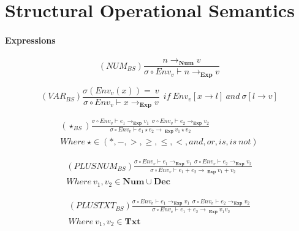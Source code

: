 \chapter{Structural Operational Semantics} \label{appendix:SOS}

\subsubsection{Expressions}

\begin{equation}
    (NUM_{BS})\frac{n \rightarrow _{\textbf{Num}} v}{\sigma \circ Env_v \vdash n \rightarrow _{\textbf{Exp}} v}
\end{equation}

\begin{equation}
    (VAR_{BS})\frac{\sigma(Env_v(x)) = \ v}{\sigma \circ Env_v \vdash x \rightarrow _{\textbf{Exp}} v } \ \
        if \ Env_v[x \rightarrow l] \ and \ \sigma[l \rightarrow v]
\end{equation}

\begin{equation}
\begin{split}
    (\star_{BS})\frac{\sigma \circ Env_v\vdash e_1 \rightarrow _{\textbf{Exp}} v_1 \ \ \sigma \circ Env_v \vdash e_2 \rightarrow _{\textbf{Exp}} v_2 }{\sigma \circ Env_v \vdash e_1 \star e_2 \rightarrow \ _{\textbf{Exp}} \ v_1 \star v_2 } \\
    Where \ \star \in (*, -, >, \geq, \leq, <, and, or, is, is \ not)
\end{split}
\end{equation}

\begin{equation}
    \begin{split}
        (PLUSNUM_{BS})\frac{\sigma \circ Env_v\vdash e_1 \rightarrow _{\textbf{Exp}} v_1 
        \ \ \sigma \circ Env_v \vdash e_2 \rightarrow _{\textbf{Exp}} v_2 }
        {\sigma \circ Env_v \vdash e_1 + e_2 \rightarrow \ _{\textbf{Exp}} \ v_1 + v_2 } \\
        Where \ v_1, v_2 \in \mathbf{Num \cup Dec}
    \end{split}
\end{equation}

\begin{equation}
    \begin{split}
        (PLUSTXT_{BS})\frac{\sigma \circ Env_v\vdash e_1 \rightarrow _{\textbf{Exp}} v_1 
        \ \ \sigma \circ Env_v \vdash e_2 \rightarrow _{\textbf{Exp}} v_2 }
        {\sigma \circ Env_v \vdash e_1 + e_2 \rightarrow \ _{\textbf{Exp}} \ v_1v_2 } \\
        Where \ v_1, v_2 \in \textbf{Txt}
    \end{split}
\end{equation}

